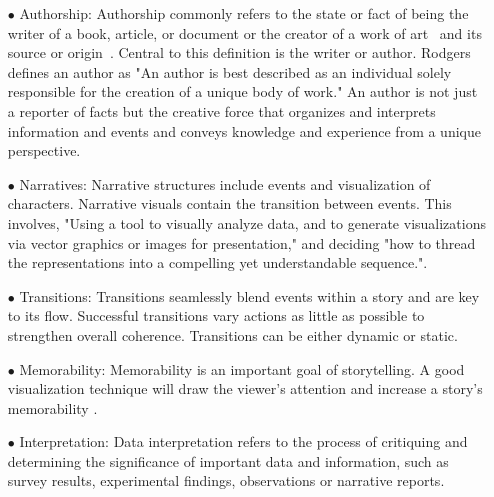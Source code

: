 \documentclass{egpubl}
\begin{document}
\begin{enumerate}
	\item[$\bullet$] Authorship: Authorship commonly refers to the state or fact of being the writer of a book, article, or document or the creator of a work of art~\cite{authoship2} and its source or origin~\cite{authoship1}. Central to this definition is the writer or author. Rodgers\cite{rodgers2011} defines an author as "An author is best described as an individual solely responsible for the creation of a unique body of work." An author is not just a reporter of facts but the creative force that organizes and interprets information and events and conveys knowledge and experience from a unique perspective. 
	\item[$\bullet$] Narratives: Narrative structures include events and visualization of characters. Narrative visuals contain the transition between events. This involves, "Using a tool to visually analyze data, and to generate visualizations via vector graphics or images for presentation," and deciding "how to thread the representations into a compelling yet understandable sequence."\cite{hullman2013deeper}.
	
	\item[$\bullet$] Transitions: Transitions seamlessly blend events within a story and are key to its flow. Successful transitions vary actions as little as possible to strengthen overall coherence. Transitions can be either dynamic or static. %
	
	\item[$\bullet$]Memorability: Memorability is an important goal of storytelling. A good visualization technique will draw the viewer's attention and increase a story's memorability \cite{bateman}. 
	
	\item[$\bullet$] Interpretation: Data interpretation refers to the process of critiquing and determining the significance of important data and information, such as survey results, experimental findings, observations or narrative reports. %
	
\end{enumerate}
\end{document}
